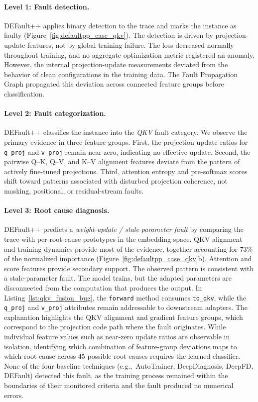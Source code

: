 \paragraph{Level 1: Fault detection.}
DEFault++ applies binary detection to the trace and marks the instance as faulty (Figure~\ref{fig:defaultpp_case_qkv}). The detection is driven by projection-update features, not by global training failure. The loss decreased normally throughout training, and no aggregate optimization metric registered an anomaly. However, the internal projection-update measurements deviated from the behavior of clean configurations in the training data. The Fault Propagation Graph propagated this deviation across connected feature groups before classification.

\paragraph{Level 2: Fault categorization.}
DEFault++ classifies the instance into the \textit{QKV} fault category. We observe the primary evidence in three feature groups. First, the projection update ratios for \texttt{q\_proj} and \texttt{v\_proj} remain near zero, indicating no effective update. Second, the pairwise Q--K, Q--V, and K--V alignment features deviate from the pattern of actively fine-tuned projections. Third, attention entropy and pre-softmax scores shift toward patterns associated with disturbed projection coherence, not masking, positional, or residual-stream faults.

\paragraph{Level 3: Root cause diagnosis.}
DEFault++ predicts a \textit{weight-update / stale-parameter fault} by comparing the trace with per-root-cause prototypes in the embedding space. QKV alignment and training dynamics provide most of the evidence, together accounting for 73\% of the normalized importance (Figure~\ref{fig:defaultpp_case_qkv}b). Attention and score features provide secondary support. The observed pattern is consistent with a stale-parameter fault. The model trains, but the adapted parameters are disconnected from the computation that produces the output. In Listing~\ref{lst:qkv_fusion_bug}, the \texttt{forward} method consumes \texttt{to\_qkv}, while the \texttt{q\_proj} and \texttt{v\_proj} attributes remain addressable to downstream adapters. The explanation highlights the QKV alignment and gradient feature groups, which correspond to the projection code path where the fault originates. While individual feature values such as near-zero update ratios are observable in isolation, identifying which combination of feature-group deviations maps to which root cause across 45 possible root causes requires the learned classifier. None of the four baseline techniques (e.g.,~AutoTrainer, DeepDiagnosis, DeepFD, DEFault) detected this fault, as the training process remained within the boundaries of their monitored criteria and the fault produced no numerical errors.

